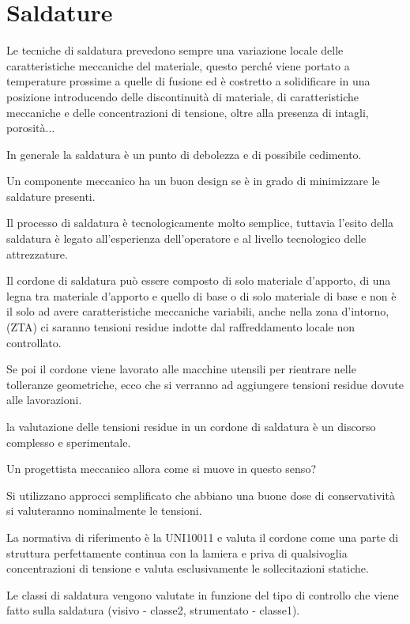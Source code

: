 \documentclass[a4paper, 15pt]{article}
\begin{document}
\section{Saldature}
\begin{adjustwidth}{2in}{}
	Le tecniche di saldatura prevedono sempre una variazione locale delle caratteristiche meccaniche del materiale, questo perché viene portato a temperature prossime a quelle di fusione ed è costretto a solidificare in una posizione introducendo delle discontinuità di materiale, di caratteristiche meccaniche e delle concentrazioni di tensione, oltre alla presenza di intagli, porosità...
	
	In generale la saldatura è un punto di debolezza e di possibile cedimento. \newline 
	
	Un componente meccanico ha un buon design se è in grado di minimizzare le saldature presenti. \newline 
	
	Il processo di saldatura è tecnologicamente molto semplice, tuttavia l'esito della saldatura è legato all'esperienza dell'operatore e al livello tecnologico delle attrezzature. \newline 
	
	Il cordone di saldatura può essere composto di solo materiale d'apporto, di una legna tra materiale d'apporto e quello di base o di solo materiale di base e non è il solo ad avere caratteristiche meccaniche variabili, anche nella zona d'intorno, (ZTA) ci saranno tensioni residue indotte dal raffreddamento locale non controllato.
	
	Se poi il cordone viene lavorato alle macchine utensili per rientrare nelle tolleranze geometriche, ecco che si verranno  ad aggiungere tensioni residue dovute alle lavorazioni. \newline 
	
	la valutazione delle tensioni residue in un cordone di saldatura è un discorso complesso e sperimentale.\newline 
	
	Un progettista meccanico allora come si muove in questo senso? 
	
	Si utilizzano approcci semplificato che abbiano una buone dose di conservatività si valuteranno nominalmente le tensioni.\newline 
	
	La normativa di riferimento è la UNI10011 e valuta il cordone come una parte di struttura perfettamente continua con la lamiera  e priva di qualsivoglia concentrazioni di tensione e valuta esclusivamente le sollecitazioni statiche. \newline 
	
Le classi di saldatura  vengono valutate in funzione del tipo di controllo che viene fatto sulla saldatura (visivo - classe2, strumentato - classe1). \end{adjustwidth}
\end{document}
